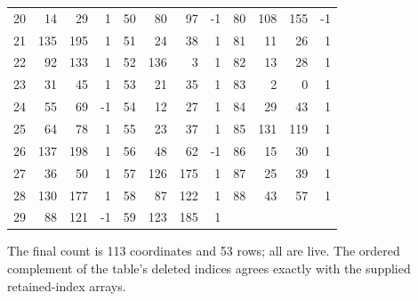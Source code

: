 \begin{center}
\begin{tabular}{@{}rrrr@{\quad}rrrr@{\quad}rrrr@{}}
20 & 14 & 29 & 1 & 50 & 80 & 97 & -1 & 80 & 108 & 155 & -1\\
21 & 135 & 195 & 1 & 51 & 24 & 38 & 1 & 81 & 11 & 26 & 1\\
22 & 92 & 133 & 1 & 52 & 136 & 3 & 1 & 82 & 13 & 28 & 1\\
23 & 31 & 45 & 1 & 53 & 21 & 35 & 1 & 83 & 2 & 0 & 1\\
24 & 55 & 69 & -1 & 54 & 12 & 27 & 1 & 84 & 29 & 43 & 1\\
25 & 64 & 78 & 1 & 55 & 23 & 37 & 1 & 85 & 131 & 119 & 1\\
26 & 137 & 198 & 1 & 56 & 48 & 62 & -1 & 86 & 15 & 30 & 1\\
27 & 36 & 50 & 1 & 57 & 126 & 175 & 1 & 87 & 25 & 39 & 1\\
28 & 130 & 177 & 1 & 58 & 87 & 122 & 1 & 88 & 43 & 57 & 1\\
29 & 88 & 121 & -1 & 59 & 123 & 185 & 1 &  &  &  & \\
\bottomrule\end{tabular}\end{center}
The final count is 113 coordinates and 53 rows; all are live. The ordered complement of the table's deleted indices agrees exactly with the supplied retained-index arrays.
